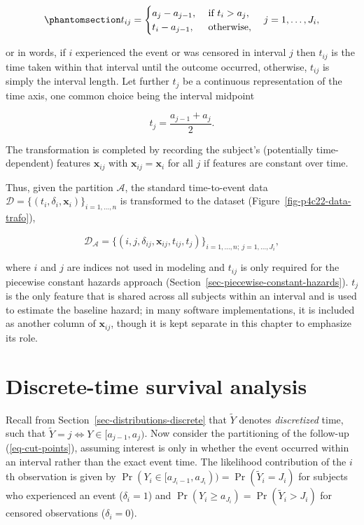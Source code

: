 \documentclass[
  letterpaper,
  krantz2]{style/krantz}
\begin{document}
\begin{equation}\phantomsection\label{eq-time-at-risk}{
t_{ij} = \begin{cases}
a_j - a_{j-1}, & \text{ if } t_i > a_j, \\
t_i - a_{j-1}, & \text{ otherwise,}\\
\end{cases}\quad j=1,\ldots,J_i,
}\end{equation}

or in words, if \(i\) experienced the event or was censored in interval
\(j\) then \(t_{ij}\) is the time taken within that interval until the
outcome occurred, otherwise, \(t_{ij}\) is simply the interval length.
Let further \(t_j\) be a continuous representation of the time axis, one
common choice being the interval midpoint

\[
t_j = \frac{a_{j-1} + a_j}{2}.
\]

The transformation is completed by recording the subject's (potentially
time-dependent) features \(\mathbf{x}_{ij}\) with
\(\mathbf{x}_{ij} = \mathbf{x}_{i}\) for all \(j\) if features are
constant over time.

Thus, given the partition \(\mathcal{A}\), the standard time-to-event
data \(\mathcal{D}= \{(t_i, \delta_i, \mathbf{x}_i)\}_{i=1,\ldots,n}\)
is transformed to the dataset (Figure~\ref{fig-p4c22-data-trafo}),

\[
\mathcal{D}_{\mathcal{A}} = \{(i, j, \delta_{ij}, \mathbf{x}_{ij}, t_{ij}, t_j)\}_{i=1,\ldots,n;\  j=1,\ldots,J_i},
\]

where \(i\) and \(j\) are indices not used in modeling and \(t_{ij}\) is
only required for the piecewise constant hazards approach
(Section~\ref{sec-piecewise-constant-hazards}). \(t_j\) is the only
feature that is shared across all subjects within an interval and is
used to estimate the baseline hazard; in many software implementations,
it is included as another column of \(\mathbf{x}_{ij}\), though it is
kept separate in this chapter to emphasize its role.

\section{Discrete-time survival
analysis}\label{sec-discrete-time-reduction}

Recall from Section~\ref{sec-distributions-discrete} that \(\tilde{Y}\)
denotes \emph{discretized} time, such that
\(\tilde{Y}=j \Leftrightarrow Y \in [a_{j-1}, a_j)\).
Now consider the partitioning of the follow-up (\ref{eq-cut-points}),
assuming interest is only in whether the event occurred within an
interval rather than the exact event time. The likelihood contribution
of the \(i\)th observation is given by
\(\Pr(Y_i \in [a_{J_i-1}, a_{J_i})) = \Pr(\tilde{Y}_i = J_i)\) for
subjects who experienced an event (\(\delta_i = 1\)) and
\(\Pr(Y_i \geq a_{J_i}) = \Pr(\tilde{Y}_i > J_i)\) for censored
observations (\(\delta_i = 0\)).
\end{document}
